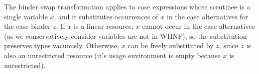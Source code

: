 \documentclass[acmsmall,review,anonymous,screen]{acmart}
\begin{document}
The binder swap transformation applies to case expressions whose scrutinee is a
single variable $x$, and it substitutes occurrences of $x$ in the case
alternatives for the case binder $z$. If $x$ is a linear resource, $x$ cannot
occur in the case alternatives (as we conservatively consider variables are not
in WHNF), so the substitution preserves types vacuously. Otherwise, $x$ can be
freely substituted by $z$, since $z$ is also an unrestricted resource (it's
usage environment is empty because $x$ is unrestricted).


















\end{document}
